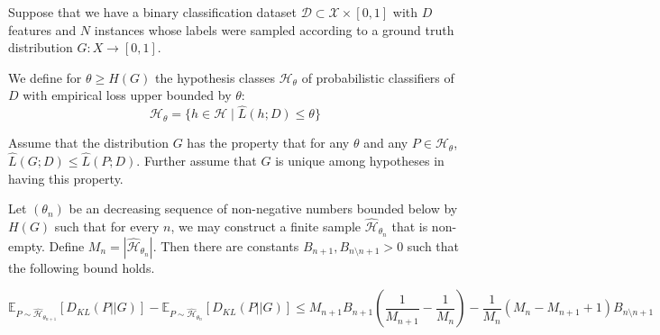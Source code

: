 \documentclass[12pt]{article}
\newenvironment{proposition}[2][Proposition]{\begin{trivlist}
\item[\hskip \labelsep {\bfseries #1}\hskip \labelsep {\bfseries #2.}]}{\end{trivlist}}
\begin{document}
\begin{proposition}{1}
    Suppose that we have a binary classification dataset $\mathcal{D}\subset \mathcal{X}\times [0,1]$ with $D$ features and $N$ instances whose labels were sampled according to a ground truth distribution $G:X \rightarrow [0,1]$. 

    We define for $\theta \geq H(G)$ the hypothesis classes $\mathcal{H}_\theta$ of probabilistic classifiers of $D$ with empirical loss upper bounded by $\theta$:
    \begin{equation*}
        \mathcal{H}_\theta = \{h \in \mathcal{H} \mid \hat{L}(h;D) \leq \theta\}
    \end{equation*}

    Assume that the distribution $G$ has the property that for any $\theta$ and any $P \in \mathcal{H}_\theta$, $\hat{L}(G;D) \leq \hat{L}(P;D)$. Further assume that $G$ is unique among hypotheses in having this property. 

    Let $(\theta_n)$ be an decreasing sequence of non-negative numbers bounded below by $H(G)$ such that for every $n$, we may construct a finite sample $\hat{\mathcal{H}}_{\theta_n}$ that is non-empty. Define $M_n = |\hat{\mathcal{H}}_{\theta_n}|$. Then there are constants $B_{n+1},B_{n\setminus n+1}>0$ such that the following bound holds.

    \begin{equation*}
        \mathds{E}_{P\sim \hat{\mathcal{H}}_{\theta_{n+1}}}[D_{KL}(P || G)] - \mathds{E}_{P\sim \hat{\mathcal{H}}_{\theta_n}}[D_{KL}(P || G)] \leq M_{n+1}B_{n+1}(\frac{1}{M_{n+1}} - \frac{1}{M_n}) - \frac{1}{M_n}(M_n - M_{n+1} + 1)B_{n\setminus n+1}
    \end{equation*}
\end{proposition}
\end{document}
